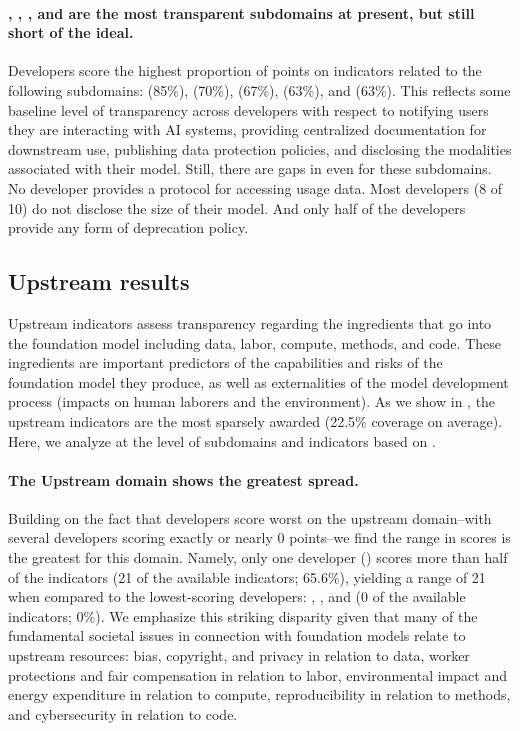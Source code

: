 \paragraph{\modelbasics, \capabilities, \limitations, and \dataprotection are the most transparent subdomains at present, but still short of the ideal.}
Developers score the highest proportion of points on indicators related to the following subdomains: \interface (85\%), \documentation (70\%), \dataprotection (67\%), \modelbasics (63\%), and \updates (63\%).
This reflects some baseline level of transparency across developers with respect to notifying users they are interacting with AI systems, providing centralized documentation for downstream use, publishing data protection policies, and disclosing the modalities associated with their model. 
Still, there are gaps in even for these subdomains. 
No developer provides a protocol for accessing usage data.
Most developers (8 of 10) do not disclose the size of their model.
And only half of the developers provide any form of deprecation policy.

\hypertarget{upstream-results}{\subsection{Upstream results}}
\label{sec:upstream-results}

Upstream indicators assess transparency regarding the ingredients that go into the foundation model including data, labor, compute, methods, and code. 
These ingredients are important predictors of the capabilities and risks of the foundation model they produce, as well as externalities of the model development process (\eg impacts on human laborers and the environment). 
As we show in , the upstream indicators are the most sparsely awarded (22.5\% coverage on average).
Here, we analyze at the level of subdomains and indicators based on . 

\paragraph{The Upstream domain shows the greatest spread.}
Building on the fact that developers score worst on the upstream domain--with several developers scoring exactly or nearly 0 points--we find the range in scores is the greatest for this domain. Namely, only one developer (\huggingface) scores more than half of the indicators (21 of the available \numupstreamindicators indicators; 65.6\%), yielding a range of 21 when compared to the lowest-scoring developers: \aitwentyone, \inflection, and \amazon (0 of the available \numupstreamindicators indicators; 0\%).
We emphasize this striking disparity given that many of the fundamental societal issues in connection with foundation models relate to upstream resources: bias, copyright, and privacy in relation to data, worker protections and fair compensation in relation to labor, environmental impact and energy expenditure in relation to compute, reproducibility in relation to methods, and cybersecurity in relation to code. 

